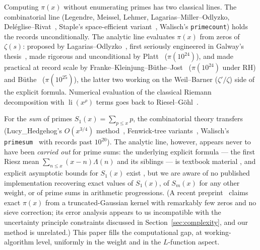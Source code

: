 \documentclass[11pt]{article}
\newcommand{\li}{\operatorname{li}}
\begin{document}
Computing $\pi(x)$ without enumerating primes has two classical lines. The
combinatorial line (Legendre, Meissel, Lehmer,
Lagarias--Miller--Odlyzko, Del\'eglise--Rivat~\cite{DR96}, Staple's
space-efficient variant~\cite{Staple15}, Walisch's \texttt{primecount})
holds the records unconditionally. The analytic line evaluates $\pi(x)$ from
zeros of $\zeta(s)$: proposed by Lagarias--Odlyzko~\cite{LO87}, first
seriously engineered in Galway's thesis~\cite{Galway04}, made rigorous and
unconditional by Platt~\cite{Platt15} ($\pi(10^{24})$), and made practical
at record scale by Franke--Kleinjung--B\"uthe--Jost~\cite{FKBJ17}
($\pi(10^{24})$ under RH) and B\"uthe~\cite{Buthe14} ($\pi(10^{25})$), the
latter two working on the Weil--Barner ($\zeta'/\zeta$) side of the explicit
formula. Numerical evaluation of the classical Riemann decomposition with
$\li(x^{\rho})$ terms goes back to Riesel--G\"ohl~\cite{RG70}.

For the \emph{sum} of primes $S_1(x)=\sum_{p\le x}p$, the combinatorial
theory transfers (Lucy\_Hedgehog's $O(x^{3/4})$ method~\cite{Lucy13},
Fenwick-tree variants~\cite{Broxey23}, Walisch's
\texttt{primesum}~\cite{Walisch} with records past $10^{20}$). The analytic
line, however, appears never to have been \emph{carried out} for prime sums:
the underlying explicit formula --- the first Riesz mean
$\sum_{n\le x}(x-n)\Lambda(n)$ and its siblings --- is textbook material
\cite{MV}, and explicit asymptotic bounds for $S_1(x)$ exist
\cite{Axler14}, but we are aware of no published implementation recovering
exact values of $S_1(x)$, of $S_m(x)$ for any other weight, or of prime
sums in arithmetic progressions. (A recent preprint~\cite{TG25} claims exact
$\pi(x)$ from a truncated-Gaussian kernel with remarkably few zeros and no
sieve correction; its error analysis appears to us incompatible with the
uncertainty principle constraints discussed in
Section~\ref{sec:complexity}, and our method is unrelated.) This paper
fills the computational gap, at working-algorithm level, uniformly in the
weight and in the $L$-function aspect.
\end{document}
